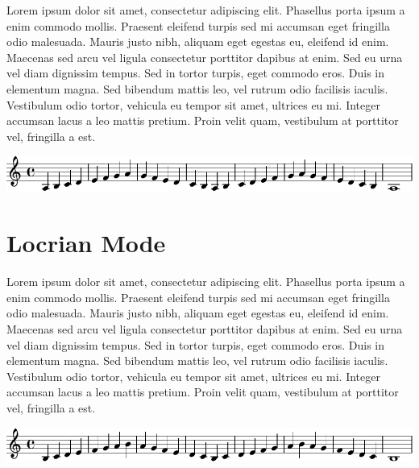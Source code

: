 \documentclass[11pt]{article}
\begin{document}
Lorem ipsum dolor sit amet, consectetur adipiscing elit. Phasellus
porta ipsum a enim commodo mollis. Praesent eleifend turpis sed mi
accumsan eget fringilla odio malesuada. Mauris justo nibh, aliquam
eget egestas eu, eleifend id enim. Maecenas sed arcu vel ligula
consectetur porttitor dapibus at enim. Sed eu urna vel diam dignissim
tempus. Sed in tortor turpis, eget commodo eros. Duis in elementum
magna. Sed bibendum mattis leo, vel rutrum odio facilisis iaculis.
Vestibulum odio tortor, vehicula eu tempor sit amet, ultrices eu mi.
Integer accumsan lacus a leo mattis pretium. Proin velit quam,
vestibulum at porttitor vel, fringilla a est.

\begin{center}
\includegraphics[width=.9\linewidth]{aeolian.pdf}
\end{center}

\section*{Locrian Mode}
\label{sec:orgc787d03}

Lorem ipsum dolor sit amet, consectetur adipiscing elit. Phasellus
porta ipsum a enim commodo mollis. Praesent eleifend turpis sed mi
accumsan eget fringilla odio malesuada. Mauris justo nibh, aliquam
eget egestas eu, eleifend id enim. Maecenas sed arcu vel ligula
consectetur porttitor dapibus at enim. Sed eu urna vel diam dignissim
tempus. Sed in tortor turpis, eget commodo eros. Duis in elementum
magna. Sed bibendum mattis leo, vel rutrum odio facilisis iaculis.
Vestibulum odio tortor, vehicula eu tempor sit amet, ultrices eu mi.
Integer accumsan lacus a leo mattis pretium. Proin velit quam,
vestibulum at porttitor vel, fringilla a est.

\begin{center}
\includegraphics[width=.9\linewidth]{locrian.pdf}
\end{center}
\end{document}
